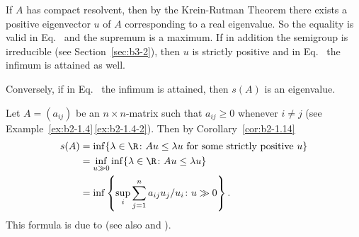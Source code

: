\begin{remark}\label{rem:b2-1.15}
If\/ $A$ has compact resolvent, then by the Krein-Rutman Theorem there exists a positive eigenvector $u$ of\/ $A$ corresponding to a real eigenvalue.
So the equality is valid in Eq.~  
and the supremum is a maximum.
If in addition the semigroup is irreducible (see Section~\ref{sec:b3-2}), then $u$ is strictly positive and in Eq.~ 
the infimum is attained as well.

Conversely, if in Eq.~ 
the infimum is attained, then $s(A)$ is an eigenvalue.
\end{remark}
\begin{example}\label{ex:b2-1.16}
Let $A = (a_{ij})$ be an $n \times n$-matrix such that $a_{ij} \geq 0$ whenever $i \neq j$ (see Example~\ref{ex:b2-1.4}\,\ref{ex:b2-1.4-2}).
Then by Corollary~\ref{cor:b2-1.14} 
\begin{align*}
    s(A) &= \inf\{\lambda \in \R \colon Au \leq \lambda u \text{ for some strictly positive } u\} \\
    &= \inf_{u \gg 0} \inf\{\lambda \in \R \colon Au \leq \lambda u\} \\
    &= \inf\left\{\sup_{i} \sum_{j=1}^{n} a_{ij} u_{j}/u_{i} \colon u \gg 0\right\}.
\end{align*}
This formula is due to \textcite{collatz:1942} (see also \textcite[Chapter I, Exercise 20]{schaefer:1974} and \textcite{wielandt:1950}).
\end{example}

